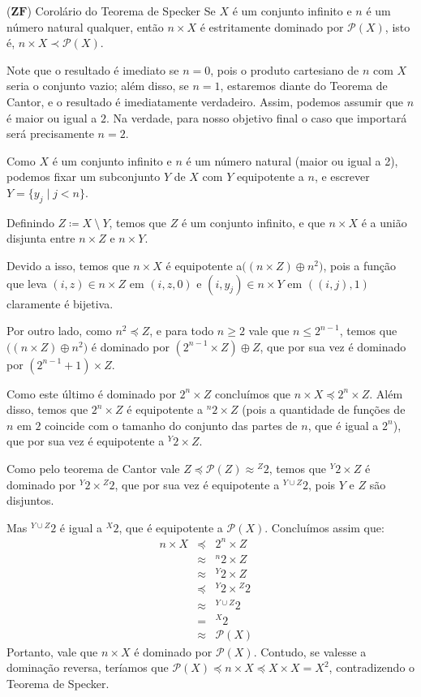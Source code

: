 \documentclass{hipatia}
\newcommand{\n}{\noindent}
\newcommand{\dem}{\n{\bf Demonstração: }}
\newcommand{\partes}[1]{\mathcal{P}(#1)}
\newcommand{\preccurlyneq}{\prec}
\newcommand{\zf}{\mathbf{ZF}}
\begin{document}
\begin{teoremacaixa*}{($\zf$) Corolário do Teorema
de Specker} Se $X$ é um conjunto infinito e $n$
é um número natural qualquer, então $n\times X$
é estritamente dominado por $\partes{X}$, isto
é, $n\times X\preccurlyneq\partes{X}$.
\end{teoremacaixa*}

Note que o resultado é imediato se $n=0$, pois o
produto cartesiano de $n$ com $X$ seria o conjunto
vazio; além disso, se $n=1$, estaremos diante do
Teorema de Cantor, e o resultado é imediatamente
verdadeiro. Assim, podemos assumir que $n$ é maior
ou igual a $2$. Na verdade, para nosso objetivo
final o caso que importará será precisamente
$n=2$.

\dem Como $X$ é um conjunto infinito e $n$ é um
número natural (maior ou igual a 2), podemos fixar
um subconjunto $Y$ de $X$ com $Y$ equipotente a
$n$, e escrever $Y=\{y_j\mid j<n\}$.

Definindo $Z\coloneq X~\setminus~Y$, temos que $Z$ é um
conjunto infinito, e que $n\times X$ é a união
disjunta entre $n\times Z$ e $n\times Y$.

Devido a isso, temos que $n\times X$ é equipotente
a\linebreak $\big((n\times Z)\oplus n^2\big)$, pois a função
que leva $(i,z)\in n\times Z$ em $(i,z,0)$ e
$(i,y_j)\in n\times Y$ em $((i,j),1)$ claramente é
bijetiva.

Por outro lado, como $n^2\preccurlyeq Z$, e para
todo $n\geq 2$ vale que $n\leq 2^{n-1}$, temos que
$\big((n\times Z)\oplus n^2\big)$ é dominado por
$(2^{n-1}\times Z)\oplus Z$, que por sua vez é
dominado por $(2^{n-1}+1)\times Z$.

Como este último é dominado por $2^n\times Z$
concluímos que $n\times X\preccurlyeq 2^n\times
Z.$ Além disso, temos que $2^n\times Z$ é
equipotente a $^n2\times Z$ (pois a quantidade de
funções de $n$ em $2$ coincide com o tamanho do
conjunto das partes de $n$, que é igual a $2^n$),
que por sua vez é equipotente a $^Y2\times Z$.

Como pelo teorema de Cantor vale
$Z\preccurlyeq\partes{Z}\approx {}^Z2$, temos que
$^Y2\times Z$ é dominado por $^Y2\times{}^Z2$, que
por sua vez é equipotente a $^{Y\cup Z}2$, pois
$Y$ e $Z$ são disjuntos.

Mas $^{Y\cup Z}2$ é igual a $^X2$, que é
equipotente a $\partes{X}$. Concluímos assim que:
$$\begin{matrix} n\times X&\preccurlyeq&2^n\times
Z \\&\approx&{}^n2\times Z
\\&\approx&{}^Y2\times Z&
\\&\preccurlyeq&{}^Y2\times {}^Z2
\\&\approx&{}^{Y\cup Z}2& \\&=&{}^X2&
\\&\approx&\mathcal{P}(X) \end{matrix}$$ Portanto,
vale que $n\times X$ é dominado por $\partes{X}$.
Contudo, se valesse a dominação reversa, teríamos
que $\mathcal{P}(X)\preccurlyeq n\times X
\preccurlyeq X\times X=X^2$, contradizendo o
Teorema de Specker.
\end{document}

